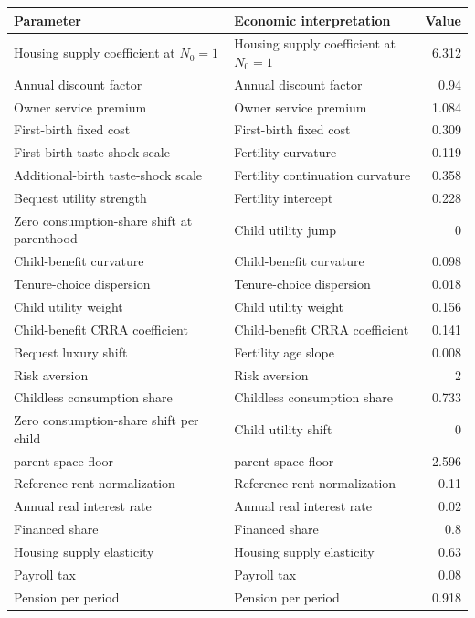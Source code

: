 \begingroup\small
\setlength{\tabcolsep}{3pt}
\renewcommand{\arraystretch}{1.04}
\begin{tabularx}{\linewidth}{XXr}
\toprule
Parameter & Economic interpretation & Value \\
\midrule
Housing supply coefficient at $N_0=1$ & Housing supply coefficient at $N_0=1$ & 6.312 \\
Annual discount factor & Annual discount factor & 0.94 \\
Owner service premium & Owner service premium & 1.084 \\
First-birth fixed cost & First-birth fixed cost & 0.309 \\
First-birth taste-shock scale & Fertility curvature & 0.119 \\
Additional-birth taste-shock scale & Fertility continuation curvature & 0.358 \\
Bequest utility strength & Fertility intercept & 0.228 \\
Zero consumption-share shift at parenthood & Child utility jump & 0 \\
Child-benefit curvature & Child-benefit curvature & 0.098 \\
Tenure-choice dispersion & Tenure-choice dispersion & 0.018 \\
Child utility weight & Child utility weight & 0.156 \\
Child-benefit CRRA coefficient & Child-benefit CRRA coefficient & 0.141 \\
Bequest luxury shift & Fertility age slope & 0.008 \\
Risk aversion & Risk aversion & 2 \\
Childless consumption share & Childless consumption share & 0.733 \\
Zero consumption-share shift per child & Child utility shift & 0 \\
parent space floor & parent space floor & 2.596 \\
Reference rent normalization & Reference rent normalization & 0.11 \\
Annual real interest rate & Annual real interest rate & 0.02 \\
Financed share & Financed share & 0.8 \\
Housing supply elasticity & Housing supply elasticity & 0.63 \\
Payroll tax & Payroll tax & 0.08 \\
Pension per period & Pension per period & 0.918 \\

\end{tabularx}
